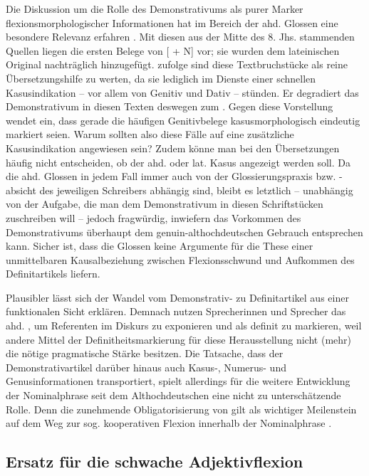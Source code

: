 Die Diskussion um die Rolle des Demonstrativums als purer Marker flexionsmorphologischer Informationen hat im Bereich der ahd. Glossen eine besondere Relevanz erfahren \parencite{Glaser2000}. Mit diesen aus der Mitte des 8. Jhs. stammenden Quellen liegen die ersten Belege von [ + N] vor; sie wurden dem lateinischen Original nachträglich  hinzugefügt. \textcite[12]{Hodler1954} zufolge sind diese Textbruchstücke als reine Übersetzungshilfe zu werten, da sie lediglich im Dienste einer schnellen Kasusindikation -- vor allem von Genitiv und Dativ -- stünden. Er degradiert das Demonstrativum in diesen Texten deswegen zum  \parencite[12]{Hodler1954}. Gegen diese Vorstellung wendet \textcite[209f.]{Glaser2000} ein, dass  gerade die häufigen Genitivbelege kasusmorphologisch eindeutig markiert seien. Warum sollten also diese Fälle auf eine zusätzliche Kasusindikation angewiesen sein? Zudem könne man bei den Übersetzungen häufig nicht entscheiden, ob der ahd. oder lat. Kasus angezeigt werden soll. Da die ahd. Glossen in jedem Fall immer auch von der Glossierungspraxis bzw. -absicht des jeweiligen Schreibers abhängig sind, bleibt es letztlich  -- unabhängig von der Aufgabe, die man dem Demonstrativum in diesen Schriftstücken zuschreiben will -- jedoch fragwürdig, inwiefern das Vorkommen des Demonstrativums überhaupt dem genuin-althochdeutschen Gebrauch entsprechen kann. Sicher ist, dass die Glossen keine Argumente für die These einer unmittelbaren Kausalbeziehung zwischen Flexionsschwund und Aufkommen des Definitartikels liefern.

Plausibler lässt sich der Wandel vom Demonstrativ- zu Definitartikel aus einer funktionalen Sicht erklären. Demnach nutzen Sprecherinnen und Sprecher das ahd. , um Referenten im Diskurs zu exponieren und als definit zu markieren, weil andere Mittel der Definitheitsmarkierung für diese Herausstellung nicht (mehr) die nötige pragmatische Stärke besitzen. Die Tatsache, dass der Demonstrativartikel darüber hinaus auch Kasus-, Numerus- und Genusinformationen transportiert, spielt allerdings für die weitere Entwicklung  der Nominalphrase seit dem Althochdeutschen eine nicht zu unterschätzende Rolle. Denn die zunehmende Obligatorisierung von  gilt als wichtiger Meilenstein auf dem Weg zur sog. kooperativen Flexion innerhalb der Nominalphrase \parencite[s. u.a.][]{Ronneberger-Sibold2010a,Szczepaniak2010}.
 
\subsection{Ersatz für die schwache Adjektivflexion} \label{ersatz-schwach}

